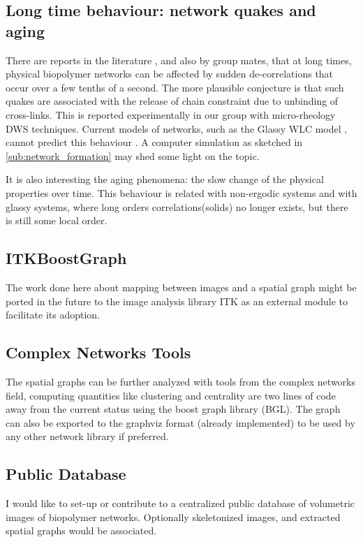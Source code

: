 \subsection{Long time behaviour: network quakes and aging}
\label{sub:quakes}
There are reports in the literature \citep{kajiya_slow_2013}, and also by group
mates\citep{vincent_micro-rheological_2013}, that at long times, physical
biopolymer networks can be affected by sudden de-correlations that occur over a
few tenths of a second. The more plausible conjecture is that such quakes are associated with the release of
chain constraint due to unbinding of cross-links.  This is reported
experimentally in our group  with micro-rheology DWS techniques.
Current models of networks, such as the Glassy WLC model
\citep{kroy_glassy_2007}, cannot predict this behaviour \citep{vincent_micro-rheological_2013}.  A
computer simulation as sketched in \autoref{sub:network_formation} may shed some light on the topic.

It is also interesting the aging phenomena: the slow change of the physical
properties over time. This behaviour is related with non-ergodic systems and
with glassy systems, where long orders correlations(solids) no longer exists,
but there is still some local order.\citep{cipelletti_slow_????}

\subsection{ITKBoostGraph}%
\label{sub:itkboostgraph}

  The work done here about mapping between images and a spatial graph might be ported in the future to the image analysis library ITK as an external module to facilitate its adoption.

\subsection{Complex Networks Tools}%
\label{sub:complex_networks_tools}

The spatial graphs can be further analyzed with tools from the complex networks field, computing quantities like clustering and centrality are two lines of code away from the current status using the boost graph library (BGL). The graph can also be exported to the graphviz format (already implemented) to be used by any other network library if preferred.

\subsection{Public Database}%
\label{sub:public_database}

  I would like to set-up or contribute to a centralized public database of volumetric images of biopolymer networks. Optionally skeletonized images, and extracted spatial graphs would be associated.

